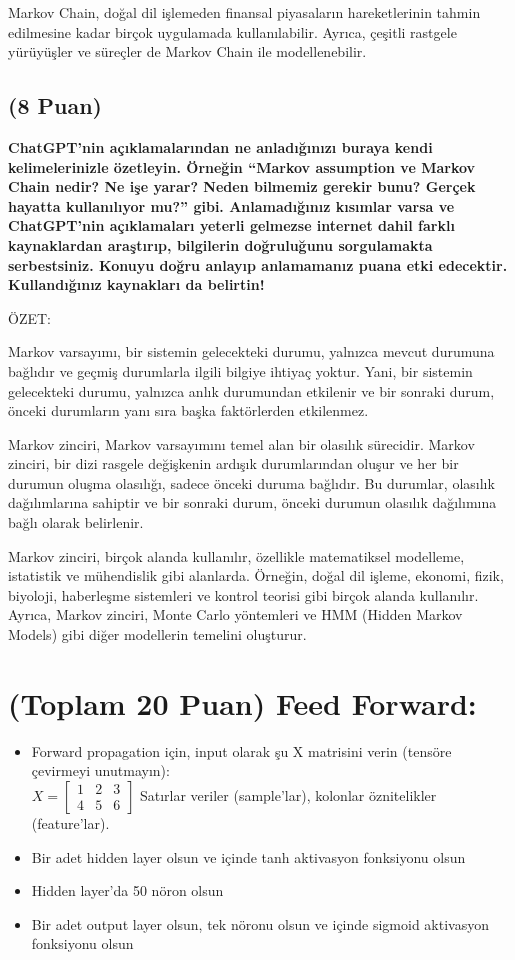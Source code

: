 \documentclass[11pt]{article}
\begin{document}
Markov Chain, doğal dil işlemeden finansal piyasaların hareketlerinin tahmin edilmesine kadar birçok uygulamada kullanılabilir. Ayrıca, çeşitli rastgele yürüyüşler ve süreçler de Markov Chain ile modellenebilir.


\subsection{(8 Puan)} \textbf{ChatGPT’nin açıklamalarından ne anladığınızı buraya kendi kelimelerinizle özetleyin. Örneğin ``Markov assumption ve Markov Chain nedir? Ne işe yarar? Neden bilmemiz gerekir bunu? Gerçek hayatta kullanılıyor mu?'' gibi. Anlamadığınız kısımlar varsa ve ChatGPT’nin açıklamaları yeterli gelmezse internet dahil farklı kaynaklardan araştırıp, bilgilerin doğruluğunu sorgulamakta serbestsiniz. Konuyu doğru anlayıp anlamamanız puana etki edecektir. Kullandığınız kaynakları da belirtin!}

ÖZET:

Markov varsayımı, bir sistemin gelecekteki durumu, yalnızca mevcut durumuna bağlıdır ve geçmiş durumlarla ilgili bilgiye ihtiyaç yoktur. Yani, bir sistemin gelecekteki durumu, yalnızca anlık durumundan etkilenir ve bir sonraki durum, önceki durumların yanı sıra başka faktörlerden etkilenmez.

Markov zinciri, Markov varsayımını temel alan bir olasılık sürecidir. Markov zinciri, bir dizi rasgele değişkenin ardışık durumlarından oluşur ve her bir durumun oluşma olasılığı, sadece önceki duruma bağlıdır. Bu durumlar, olasılık dağılımlarına sahiptir ve bir sonraki durum, önceki durumun olasılık dağılımına bağlı olarak belirlenir.

Markov zinciri, birçok alanda kullanılır, özellikle matematiksel modelleme, istatistik ve mühendislik gibi alanlarda. Örneğin, doğal dil işleme, ekonomi, fizik, biyoloji, haberleşme sistemleri ve kontrol teorisi gibi birçok alanda kullanılır. Ayrıca, Markov zinciri, Monte Carlo yöntemleri ve HMM (Hidden Markov Models) gibi diğer modellerin temelini oluşturur.




\section{(Toplam 20 Puan) Feed Forward:}
 
\begin{itemize}
    \item Forward propagation için, input olarak şu X matrisini verin (tensöre çevirmeyi unutmayın):\\
    $X = \begin{bmatrix}
        1 & 2 & 3\\
        4 & 5 & 6
        \end{bmatrix}$
    Satırlar veriler (sample'lar), kolonlar öznitelikler (feature'lar).
    \item Bir adet hidden layer olsun ve içinde tanh aktivasyon fonksiyonu olsun
    \item Hidden layer'da 50 nöron olsun
    \item Bir adet output layer olsun, tek nöronu olsun ve içinde sigmoid aktivasyon fonksiyonu olsun
\end{itemize}
\end{document}
